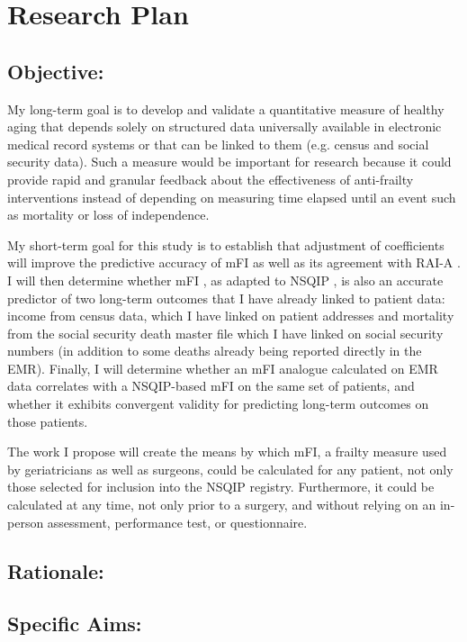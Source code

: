 \section{Research Plan }\label{research-plan}


\subsection{Objective:}\label{objective}
  
My long-term goal is to develop and validate a quantitative measure of healthy aging that depends solely on structured data universally available in electronic medical record systems or that can be linked to them (e.g. census and social security data). Such a measure would be important for research because it could provide rapid and granular feedback about the effectiveness of anti-frailty interventions instead of depending on measuring time elapsed until an event such as mortality or loss of independence. 

My short-term goal for this study is to establish that  adjustment of coefficients will improve the predictive accuracy of mFI as well as its agreement with RAI-A \cite{Isharwal_2016,Melin_2015}. I will then determine whether mFI \cite{Rockwood_2005}, as adapted to NSQIP \cite{Tsiouris_2013}, is also an accurate predictor of two long-term outcomes that I have already linked to patient data: income from census data, which I have linked on patient addresses and mortality from the social security death master file which I have linked on social security numbers (in addition to some deaths already being reported directly in the EMR). Finally, I will determine whether an mFI analogue calculated on EMR data correlates with a NSQIP-based mFI on the same set of patients, and whether it exhibits convergent validity for predicting long-term outcomes on those patients. 

The work I propose will create the means by which mFI, a frailty measure used by geriatricians as well as surgeons, could be calculated for any patient, not only those selected for inclusion into the NSQIP registry. Furthermore, it could be calculated at any time, not only prior to a surgery, and without relying on an in-person assessment, performance test, or questionnaire.

\subsection{Rationale:}\label{rationale}

\subsection{Specific Aims:}\label{specific-aims}
